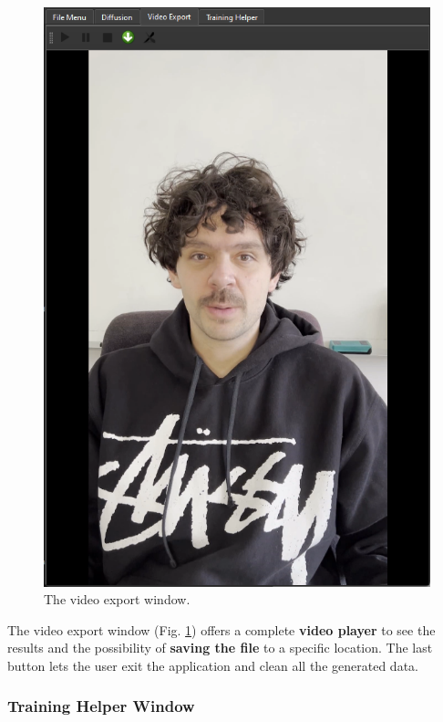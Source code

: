 \documentclass[preprint]{elsarticle}
\begin{document}
\begin{figure}[H]
	\centering
	\includegraphics[scale=0.3, keepaspectratio]{img/project_img/video-window.png}
	\caption{The video export window.}
	\label{fig:video-player}
\end{figure}

The video export window (Fig. \ref{fig:video-player}) offers a complete \textbf{video player} 
to see the results and the possibility of \textbf{saving the file} to a specific location. 
The last button lets the user exit the application and clean all the generated data.


\subsubsection{Training Helper Window}
\end{document}
